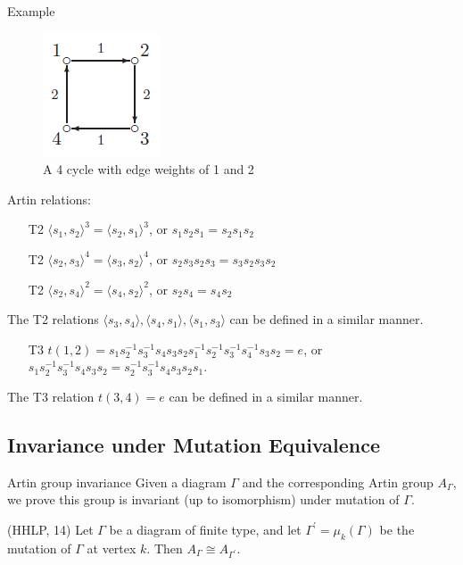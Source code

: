 \documentclass{beamer}
\begin{document}
\begin{frame}{Example}
\begin{figure}
\centering
\includegraphics[scale=.5]{4cycle.PNG}
\caption{A 4 cycle with edge weights of 1 and 2}
\end{figure}

\small
Artin relations:
\begin{itemize}
\item[T2] $\langle s_1, s_2 \rangle ^3 = \langle s_2, s_1 \rangle ^3$, or $s_1s_2s_1 = s_2s_1s_2$
\item[T2] $\langle s_2, s_3 \rangle ^4 = \langle s_3, s_2 \rangle ^4$, or $s_2s_3s_2s_3 = s_3s_2s_3s_2$
\item[T2] $\langle s_2, s_4 \rangle ^2 = \langle s_4, s_2 \rangle ^2$, or $s_2s_4 = s_4s_2$
\end{itemize}
The T2 relations $\langle s_3, s_4 \rangle, \langle s_4, s_1 \rangle, \langle s_1, s_3 \rangle$ can be defined in a similar manner.
\begin{itemize}
\item[T3] $t(1,2) = s_1s_2^{-1}s_3^{-1}s_4s_3s_2s_1^{-1}s_2^{-1}s_3^{-1}s_4^{-1}s_3s_2 = e$, or $s_1s_2^{-1}s_3^{-1}s_4s_3s_2 = s_2^{-1}s_3^{-1}s_4s_3s_2s_1$.
\end{itemize}

The T3 relation $t(3,4) = e$ can be defined in a similar manner.
\end{frame}



\subsection{Invariance under Mutation Equivalence}

\begin{frame}{Artin group invariance}
Given a diagram $\Gamma$ and the corresponding Artin group $A_{\Gamma}$, we prove this group is invariant (up to isomorphism) under mutation of $\Gamma$.

\begin{theorem}{(HHLP, 14)}
Let $\Gamma$ be a diagram of finite type, and let $\Gamma^{\prime} = \mu_k(\Gamma)$ be the mutation of $\Gamma$ at vertex $k$. Then $A_{\Gamma} \cong A_{\Gamma^{\prime}}$.
\end{theorem}
\end{frame}
\end{document}
